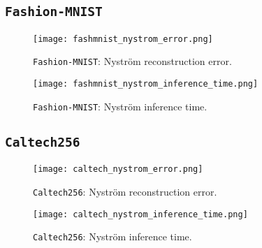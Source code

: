 \subsection{\texttt{Fashion-MNIST}}
\begin{figure*}[h]
 \begin{subfigure}[]{.49\textwidth}
\texttt{[image: fashmnist\_nystrom\_error.png]}
\caption{\texttt{Fashion-MNIST}: Nyström reconstruction error.}
\label{fig:fashmnist:nystrom_error}
\end{subfigure}
\begin{subfigure}[]{.49\textwidth}
\texttt{[image: fashmnist\_nystrom\_inference\_time.png]}
\caption{\texttt{Fashion-MNIST}: Nyström inference time.}
\label{fig:fashmnist:nystrom_time}
\end{subfigure}
\end{figure*}
\FloatBarrier
\subsection{\texttt{Caltech256}      }
\begin{figure*}[h]
\begin{subfigure}[]{.49\textwidth}
\texttt{[image: caltech\_nystrom\_error.png]}
\caption{\texttt{Caltech256}: Nyström reconstruction error.}
\label{fig:caltech:nystrom_error}
\end{subfigure}
\begin{subfigure}[]{.49\textwidth}
\texttt{[image: caltech\_nystrom\_inference\_time.png]}
\caption{\texttt{Caltech256}: Nyström inference time.}
\label{fig:caltech:nystrom_time}
\end{subfigure}
\end{figure*}











